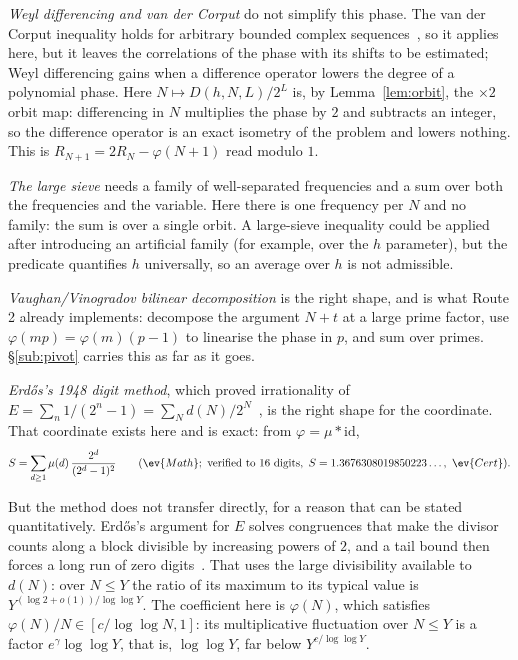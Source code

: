 \emph{Weyl differencing and van der Corput} do not simplify this phase. The
van der Corput inequality holds for arbitrary bounded complex
sequences~\cite[Theorem~2.1]{edeko-vdc}, so it applies here, but it leaves the
correlations of the phase with its shifts to be estimated; Weyl differencing
gains when a difference operator lowers the degree of a polynomial phase.
Here $N\mapsto D(h,N,L)/2^{L}$ is, by Lemma~\ref{lem:orbit}, the
$\times 2$ orbit map: differencing in $N$ multiplies the phase by $2$ and
subtracts an integer, so the difference operator is an exact isometry of the
problem and lowers nothing. This is
$R_{N+1}=2R_N-\varphi(N+1)$ read modulo $1$.

\emph{The large sieve} needs a family of well-separated frequencies and a
sum over both the frequencies and the variable. Here there is one frequency
per $N$ and no family: the sum is over a single orbit. A large-sieve
inequality could be applied after introducing an artificial family (for
example, over the $h$ parameter), but the predicate quantifies $h$
universally, so an average over $h$ is not admissible.

\emph{Vaughan/Vinogradov bilinear decomposition} is the right shape, and is
what Route 2 already implements: decompose the argument $N+t$ at a large
prime factor, use $\varphi(mp)=\varphi(m)(p-1)$ to linearise the phase in
$p$, and sum over primes. \S\ref{sub:pivot} carries this as far as it goes.

\emph{Erd\H{o}s's 1948 digit method}, which proved irrationality of
$E=\sum_n 1/(2^n-1)=\sum_N d(N)/2^N$~\cite{erdos1948lambert}, is the right shape for the
 coordinate. That coordinate exists here and is
exact: from $\varphi=\mu * \mathrm{id}$,
\begin{equation}\label{eq:mobmers}
  S=\sum_{d\ge 1}\mu(d)\,\frac{2^{d}}{(2^{d}-1)^{2}}
  \qquad (\ev{Math};\ \text{verified to }16\ \text{digits},\ S=1.3676308019850223\ldots,\ \ev{Cert}).
\end{equation}

But the method does not transfer directly, for a reason that can be stated
quantitatively. Erd\H{o}s's argument for $E$ solves congruences that make the
divisor counts along a block divisible by increasing powers of $2$, and a tail
bound then forces a long run of zero digits~\cite[pp.~63--66]{erdos1948lambert}.
That uses the large divisibility available to $d(N)$: over
$N\le Y$ the ratio of its maximum to its typical value is
$Y^{(\log 2+o(1))/\log\log Y}$. The coefficient here is
$\varphi(N)$, which satisfies $\varphi(N)/N\in[c/\log\log N,1]$: its
multiplicative fluctuation over $N\le Y$ is a factor $e^{\gamma}\log\log Y$,
that is, $\log\log Y$, far below $Y^{c/\log\log Y}$.

